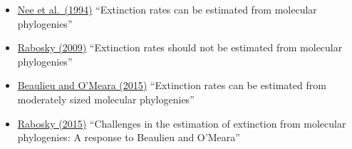 \documentclass[
]{article}
\providecommand{\tightlist}{%
  \setlength{\itemsep}{0pt}\setlength{\parskip}{0pt}}
\begin{document}
\begin{itemize}
\tightlist
\item
  \href{http://rstb.royalsocietypublishing.org/content/344/1307/77}{Nee et al.~(1994)} ``Extinction rates can be estimated from molecular phylogenies''
\item
  \href{http://onlinelibrary.wiley.com/doi/10.1111/j.1558-5646.2009.00926.x/abstract}{Rabosky (2009)} ``Extinction rates should not be estimated from molecular phylogenies''
\item
  \href{http://onlinelibrary.wiley.com/doi/10.1111/evo.12614/abstract}{Beaulieu and O'Meara (2015)} ``Extinction rates can be estimated from moderately sized molecular phylogenies''
\item
  \href{http://onlinelibrary.wiley.com/doi/10.1111/evo.12820/full}{Rabosky (2015)} ``Challenges in the estimation of extinction from molecular phylogenies: A response to Beaulieu and O'Meara''
\end{itemize}
\end{document}
